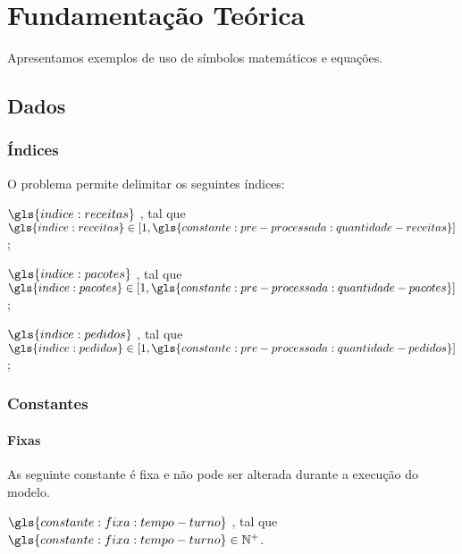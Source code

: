 \chapter{Fundamentação Teórica}%
\label{cap:fundamentacao}

Apresentamos exemplos de uso de símbolos matemáticos e equações.

\section{Dados}

\subsection{Índices}

O problema permite delimitar os seguintes índices:

\begin{symbols}
    \item[\( \gls{indice:receitas} \)]
    ,
    tal que \(  \gls{indice:receitas} \in [1, \gls{constante:pre-processada:quantidade-receitas}] \);

    \item[\( \gls{indice:pacotes} \)]
    ,
    tal que \(  \gls{indice:pacotes} \in [1, \gls{constante:pre-processada:quantidade-pacotes}] \);

    \item[\( \gls{indice:pedidos} \)]
    ,
    tal que \(  \gls{indice:pedidos} \in [1, \gls{constante:pre-processada:quantidade-pedidos}] \);
\end{symbols}

\subsection{Constantes}

\subsubsection{Fixas}

As seguinte constante é fixa e não pode ser alterada durante a execução do modelo.

\begin{symbols}
    \item[\( \gls{constante:fixa:tempo-turno} \) ]
    ,
    tal que \(  \gls{constante:fixa:tempo-turno} \in \mathbb{N}^{+} \).
\end{symbols}

